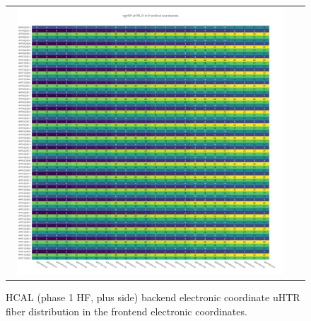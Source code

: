 \begin{figure}[htb]
 \begin{center}
  \begin{tabular}{cc}
   \includegraphics[angle=0,width=0.95\textwidth]{figures/appendix/ngHFP_uHTR_FI_in_FrontEnd.png}
  \end{tabular}
  \caption{HCAL (phase 1 HF, plus side) backend electronic coordinate uHTR fiber distribution in the frontend electronic coordinates.}
  \label{fig:lmapngHFPuHTRFIFEC}
 \end{center}
\end{figure}
\clearpage

